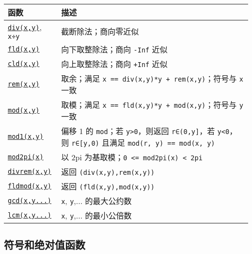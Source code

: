 \begin{table}[h]

\begin{tabulary}{\linewidth}{|L|L|}
\hline
函数 & 描述 \\
\hline
\hyperlink{8020976424566491334}{\texttt{div(x,y)}}, \texttt{x÷y} & 截断除法；商向零近似 \\
\hline
\hyperlink{15067916827074788527}{\texttt{fld(x,y)}} & 向下取整除法；商向 \texttt{-Inf} 近似 \\
\hline
\hyperlink{7922388465305816555}{\texttt{cld(x,y)}} & 向上取整除法；商向 \texttt{+Inf} 近似 \\
\hline
\hyperlink{3827563084771191385}{\texttt{rem(x,y)}} & 取余；满足 \texttt{x == div(x,y)*y + rem(x,y)}；符号与 \texttt{x} 一致 \\
\hline
\hyperlink{2082041235715276573}{\texttt{mod(x,y)}} & 取模；满足 \texttt{x == fld(x,y)*y + mod(x,y)}；符号与 \texttt{y} 一致 \\
\hline
\hyperlink{13778479217547823795}{\texttt{mod1(x,y)}} & 偏移 1 的 \texttt{mod}；若 \texttt{y>0}，则返回 \texttt{r∈(0,y]}，若 \texttt{y<0}，则 \texttt{r∈[y,0)} 且满足 \texttt{mod(r, y) == mod(x, y)} \\
\hline
\hyperlink{15322754370885673769}{\texttt{mod2pi(x)}} & 以 2pi 为基取模；\texttt{0 <= mod2pi(x) < 2pi} \\
\hline
\hyperlink{6106909621813654214}{\texttt{divrem(x,y)}} & 返回 \texttt{(div(x,y),rem(x,y))} \\
\hline
\hyperlink{2806360720034558325}{\texttt{fldmod(x,y)}} & 返回 \texttt{(fld(x,y),mod(x,y))} \\
\hline
\hyperlink{15906911311436241979}{\texttt{gcd(x,y...)}} & \texttt{x}, \texttt{y},... 的最大公约数 \\
\hline
\hyperlink{12975400110924105221}{\texttt{lcm(x,y...)}} & \texttt{x}, \texttt{y},... 的最小公倍数 \\
\hline
\end{tabulary}

\end{table}



\hypertarget{1398763230003382412}{}


\subsection{符号和绝对值函数}




